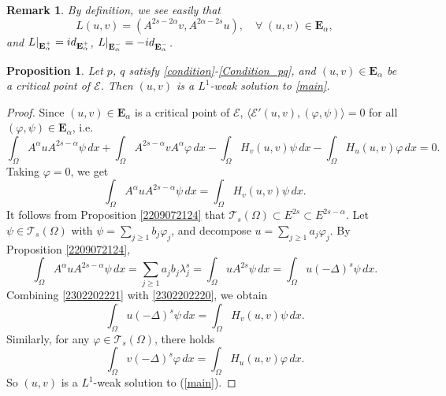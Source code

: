 \documentclass[10pt]{article}
\numberwithin{equation}{section}
\newtheorem{proposition}[theorem]{Proposition}
\newtheorem{remark}[theorem]{Remark}
\numberwithin{equation}{section}
\begin{document}
\begin{remark}\label{2302211357}
By definition, we see easily that
\[
L(u, v)=(A^{2s-2\alpha}v, A^{2\alpha-2s}u ),\quad \forall\; (u, v)\in \mathbf{E}_{\alpha},
\]
and $L|_{ \mathbf{E}_{\alpha}^+}={\rm id}_{\mathbf{E}_{\alpha}^+}$, $L|_{ \mathbf{E}_{\alpha}^-}=-{\rm id}_{\mathbf{E}_{\alpha}^-}$.
\end{remark}

\begin{proposition}\label{2302302237}
Let $p$, $q$ satisfy \eqref{condition}-\eqref{Condition_pq}, and $(u,v)\in \mathbf{E}_{\alpha}$ be a critical point of $\mathcal{E}$. Then $(u, v)$ is a $L^1$-weak solution to \eqref{main}.
\end{proposition}
\begin{proof}
Since $(u,v)\in \mathbf{E}_{\alpha}$ is a critical point of $\mathcal{E}$, $\langle \mathcal{E}'(u,v), (\varphi,\psi)\rangle=0$ for all $(\varphi,\psi)\in \mathbf{E}_{\alpha}$, i.e.
\[
\int_{\Omega}A^\alpha uA^{2s-\alpha}\psi\, dx+\int_{\Omega}A^{2s-\alpha} vA^{\alpha}\varphi\, dx-\int_{\Omega}H_v(u,v)\psi\, dx-\int_{\Omega}H_u(u, v)\varphi\, dx=0.
\]
Taking $\varphi=0$, we get
\begin{equation}\label{2302202221}
\int_{\Omega}A^\alpha uA^{2s-\alpha}\psi\, dx=\int_{\Omega}H_v(u,v)\psi\, dx.
\end{equation}
It follows from Proposition \ref{2209072124} that $\mathcal{T}_s(\Omega)\subset E^{2s}\subset E^{2s-\alpha}$. Let $\psi\in \mathcal{T}_s(\Omega)$ with $\psi=\sum_{j\ge 1}  b_j \varphi_j$, and decompose $u=\sum_{j\ge 1} a_j \varphi_j$.  By Proposition \ref{2209072124},
\begin{equation}\label{2302202220}
\int_{\Omega}A^\alpha uA^{2s-\alpha}\psi\, dx=\sum_{j\ge 1}  a_jb_j\lambda_j^{s}=\int_{\Omega} uA^{2s}\psi\, dx=\int_{\Omega} u(-\Delta)^s\psi\, dx.
\end{equation}
Combining \eqref{2302202221} with \eqref{2302202220}, we obtain
$$\int_{\Omega} u(-\Delta)^s\psi\, dx=\int_{\Omega}H_v(u,v)\psi\, dx.$$
Similarly, for any $\varphi \in \mathcal{T}_s(\Omega)$, there holds
$$\int_{\Omega} v(-\Delta)^s\varphi\, dx=\int_{\Omega}H_u(u,v)\varphi\, dx.$$
So $(u,v)$ is a $L^1$-weak solution to (\ref{main}).
\end{proof}
\end{document}

